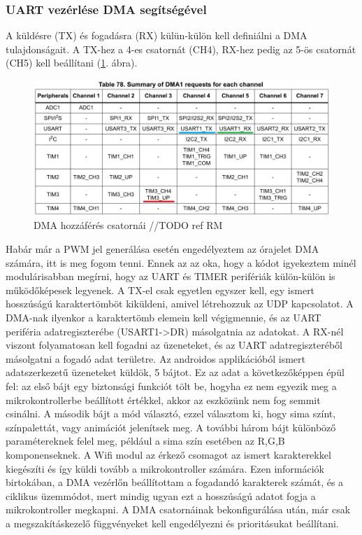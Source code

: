\documentclass[../main.tex]{subfiles}
\begin{document}
        \subsubsection{UART vezérlése DMA segítségével}
            A küldésre (TX) és fogadásra (RX) külün-külön kell definiálni a DMA tulajdonságait. A TX-hez a 4-es csatornát (CH4), RX-hez pedig az 5-ös csatornát (CH5) kell beállítani (\ref{fig:dma_request}. ábra).
            \begin{figure}[h!]
                \centering
                    \includegraphics[width=12cm]{mbed_res/dma_requests}
                \caption{DMA hozzáférés csatornái //TODO ref RM}
                \label{fig:dma_request}
            \end{figure}
            
            Habár már a PWM jel generálása esetén engedélyeztem az órajelet DMA számára, itt is meg fogom tenni. Ennek az az oka, hogy a kódot igyekeztem minél modulárisabban megírni, hogy az UART és TIMER perifériák külön-külön is működőképesek legyenek. A TX-el csak egyetlen egyszer kell, egy ismert hosszúságú karaktertömböt kiküldeni, amivel létrehozzuk az UDP kapcsolatot. A DMA-nak ilyenkor a karaktertömb elemein kell végigmennie, és az UART periféria adatregiszterébe (USART1->DR) másolgatnia az adatokat. A RX-nél viszont folyamatosan kell fogadni az üzeneteket, és az UART adatregiszteréből másolgatni a fogadó adat területre. Az androidos applikációból ismert adatszerkezetű üzeneteket küldök, 5 bájtot. Ez az adat a következőképpen épül fel: az első bájt egy biztonsági funkciót tölt be, hogyha ez nem egyezik meg a mikrokontrollerbe beállított értékkel, akkor az eszközünk nem fog semmit csinálni. A második bájt a mód választó, ezzel választom ki, hogy sima színt, színpalettát, vagy animációt jelenítsek meg. A további három bájt különböző paramétereknek felel meg, például a sima szín esetében az R,G,B komponenseknek. A Wifi modul az érkező csomagot az ismert karakterekkel kiegészíti és így küldi tovább a mikrokontroller számára. Ezen információk birtokában, a DMA vezérlőn beállítottam a fogadandó karakterek számát, és a ciklikus üzemmódot, mert mindig ugyan ezt a hosszúságú adatot fogja a mikrokontroller megkapni. A DMA csatornáinak bekonfigurálása után, már csak a megszakításkezelő függvényeket kell engedélyezni és prioritásukat beállítani.
            
\end{document}
